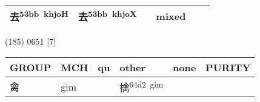 \documentclass[14pt,a4paper]{scrartcl}
\begin{document}
\begin{longtable}[c]{@{}llllll@{}}
\begin{minipage}[t]{0.14\columnwidth}
去\textsuperscript{53bb~khjoH}
\strut\end{minipage} &
\begin{minipage}[t]{0.14\columnwidth}\raggedright\strut
去\textsuperscript{53bb~khjoX}
\strut\end{minipage} &
\begin{minipage}[t]{0.14\columnwidth}\raggedright\strut
\strut\end{minipage} &
\begin{minipage}[t]{0.14\columnwidth}\raggedright\strut
mixed
\strut\end{minipage}\tabularnewline
\bottomrule
\end{longtable}

(185) 0651 {[}7{]}

\begin{longtable}[c]{@{}llllll@{}}
\toprule
\begin{minipage}[b]{0.14\columnwidth}\raggedright\strut
GROUP
\strut\end{minipage} &
\begin{minipage}[b]{0.14\columnwidth}\raggedright\strut
MCH
\strut\end{minipage} &
\begin{minipage}[b]{0.14\columnwidth}\raggedright\strut
qu
\strut\end{minipage} &
\begin{minipage}[b]{0.14\columnwidth}\raggedright\strut
other
\strut\end{minipage} &
\begin{minipage}[b]{0.14\columnwidth}\raggedright\strut
none
\strut\end{minipage} &
\begin{minipage}[b]{0.14\columnwidth}\raggedright\strut
PURITY
\strut\end{minipage}\tabularnewline
\midrule
\endhead
\begin{minipage}[t]{0.14\columnwidth}\raggedright\strut
禽
\strut\end{minipage} &
\begin{minipage}[t]{0.14\columnwidth}\raggedright\strut
gim
\strut\end{minipage} &
\begin{minipage}[t]{0.14\columnwidth}\raggedright\strut
\strut\end{minipage} &
\begin{minipage}[t]{0.14\columnwidth}\raggedright\strut
擒\textsuperscript{64d2~gim}
\strut\end{minipage} &
\begin{minipage}[t]{0.14\columnwidth}\raggedright\strut

\end{minipage}
\end{longtable}
\end{document}
